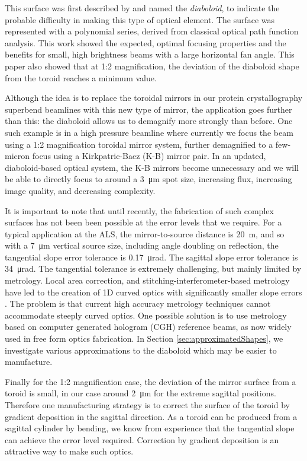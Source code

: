 \documentclass{iucr}       %
\begin{document}
This surface was first described by \cite{McKinneySPIE2009} and named the {\it diaboloid}, to indicate the probable difficulty in making this type of optical element. The surface was represented with a polynomial series, derived from classical optical path function analysis. This work showed the expected, optimal focusing properties and the benefits for small, high brightness beams with a large horizontal fan angle. This paper also showed that at 1:2 magnification, the deviation of the diaboloid shape from the toroid reaches a minimum value.

Although the idea is to replace the toroidal mirrors in our protein crystallography superbend beamlines with this new type of mirror, the application goes further than this: the diaboloid allows us to demagnify more strongly than before. One such example is in a high pressure beamline where currently we focus the beam using a 1:2 magnification toroidal mirror system, further demagnified to a few-micron focus using a Kirkpatric-Baez (K-B) mirror pair. In an updated, diaboloid-based optical system, the K-B mirrors become unnecessary and we will be able to directly focus to around a \SI{3}{\micro\meter} spot size, increasing flux, increasing image quality, and decreasing complexity.

It is important to note that until recently, the fabrication of such complex surfaces has not been been possible at the error levels that we require. For a typical application at the ALS, the mirror-to-source distance is \SI{20}{\meter}, and so with a \SI{7}{\micro\meter} vertical source size, including angle doubling on reflection, the tangential slope error tolerance is \SI{0.17}{\micro\radian}. The sagittal slope error tolerance is \SI{34}{\micro\radian}. The tangential tolerance is extremely challenging, but mainly limited by metrology. Local area correction, and stitching-interferometer-based metrology have led to the creation of 1D curved optics with significantly smaller slope errors \cite{Yamauchi2002}. The problem is that current high accuracy metrology techniques cannot accommodate steeply curved optics. One possible solution is to use metrology based on computer generated hologram (CGH) reference beams, as now widely used in free form optics fabrication. In Section \ref{sec:approximatedShapes}, we investigate various approximations to the diaboloid which may be easier to manufacture.

Finally for the 1:2 magnification case, the deviation of the mirror surface from a toroid is small, in our case around \SI{2}{\micro\meter} for the extreme sagittal positions. Therefore one manufacturing strategy is to correct the surface of the toroid by gradient deposition in the sagittal direction. As a toroid can be produced from a sagittal cylinder by bending, we know from experience that the tangential slope can achieve the error level required. Correction by gradient deposition is an attractive way to make such optics. 
\end{document}
